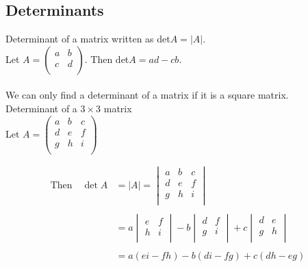 \documentclass[11pt,a4paper]{article}
\theoremstyle{definition}
\begin{document}
\subsection{Determinants}
Determinant of a matrix written as det$A=|A|$.\\
Let $A=
\begin{pmatrix}
a & b\\
c & d\\
\end{pmatrix}
$. Then det$A=ad-cb$.\\\\
We can only find a determinant of a matrix if it is a square matrix.\\

Determinant of a $3\times 3$ matrix\\
Let $A=
\begin{pmatrix}
a & b & c\\
d & e & f\\
g & h & i\\
\end{pmatrix}
$

\begin{align*}
\text{Then}\quad  \det A &=
|A|=
\begin{vmatrix}
a & b & c\\
d & e & f\\
g & h & i\\
\end{vmatrix}\\\\
& = a
\begin{vmatrix}
e & f\\
h & i\\
\end{vmatrix}
- b
\begin{vmatrix}
d & f\\
g & i\\
\end{vmatrix}
+ c
\begin{vmatrix}
d & e\\
g & h\\
\end{vmatrix}\\\\
& = a(ei-fh)-b(di-fg)+c(dh-eg)\\
\end{align*}
\end{document}
